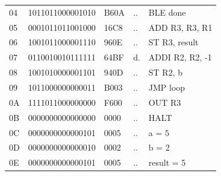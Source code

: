 \begin{tcolorbox}[stepbox, title={Instruction 12 \hfill ticks 34 to 36 \quad BLE done}]
{\begin{tabular}{@{}lllll@{}}
04 & 1011011000001010 & B60A & .. & BLE done\\
\rowcolor{pcc}05 & 0001011011001000 & 16C8 & .. & ADD R3, R3, R1\\
06 & 1001011000001110 & 960E & .. & ST R3, result\\
07 & 0110010010111111 & 64BF & d. & ADDI R2, R2, -1\\
08 & 1001010000001101 & 940D & .. & ST R2, b\\
09 & 1011000000000011 & B003 & .. & JMP loop\\
0A & 1111011000000000 & F600 & .. & OUT R3\\
0B & 0000000000000000 & 0000 & .. & HALT\\
\rowcolor{datac}0C & 0000000000000101 & 0005 & .. & a = 5\\
\rowcolor{datac}0D & 0000000000000010 & 0002 & .. & b = 2\\
\rowcolor{datac}0E & 0000000000000101 & 0005 & .. & result = 5\\
\end{tabular}}
\end{tcolorbox}\par\vspace{3pt}
